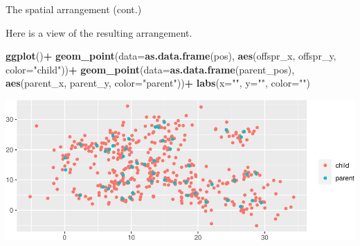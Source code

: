 \documentclass[
  ignorenonframetext,
]{beamer}
\newenvironment{Shaded}{\begin{snugshade}}{\end{snugshade}}
\newcommand{\DataTypeTok}[1]{\textcolor[rgb]{0.13,0.29,0.53}{#1}}
\newcommand{\KeywordTok}[1]{\textcolor[rgb]{0.13,0.29,0.53}{\textbf{#1}}}
\newcommand{\NormalTok}[1]{#1}
\newcommand{\OperatorTok}[1]{\textcolor[rgb]{0.81,0.36,0.00}{\textbf{#1}}}
\newcommand{\StringTok}[1]{\textcolor[rgb]{0.31,0.60,0.02}{#1}}
\begin{document}
\begin{frame}[fragile]{The spatial arrangement (cont.)}
\protect\hypertarget{the-spatial-arrangement-cont.}{}

Here is a view of the resulting arrangement.

\scriptsize

\begin{Shaded}
\begin{Highlighting}[]
\KeywordTok{ggplot}\NormalTok{()}\OperatorTok{+}
\StringTok{  }\KeywordTok{geom_point}\NormalTok{(}\DataTypeTok{data=}\KeywordTok{as.data.frame}\NormalTok{(pos), }
             \KeywordTok{aes}\NormalTok{(offspr_x, offspr_y, }\DataTypeTok{color=}\StringTok{"child"}\NormalTok{))}\OperatorTok{+}
\StringTok{  }\KeywordTok{geom_point}\NormalTok{(}\DataTypeTok{data=}\KeywordTok{as.data.frame}\NormalTok{(parent_pos), }
             \KeywordTok{aes}\NormalTok{(parent_x, parent_y, }\DataTypeTok{color=}\StringTok{"parent"}\NormalTok{))}\OperatorTok{+}
\StringTok{  }\KeywordTok{labs}\NormalTok{(}\DataTypeTok{x=}\StringTok{""}\NormalTok{, }\DataTypeTok{y=}\StringTok{""}\NormalTok{, }\DataTypeTok{color=}\StringTok{""}\NormalTok{)}
\end{Highlighting}
\end{Shaded}

\includegraphics{simulation_files/figure-beamer/unnamed-chunk-15-1.pdf}

\end{frame}
\end{document}
